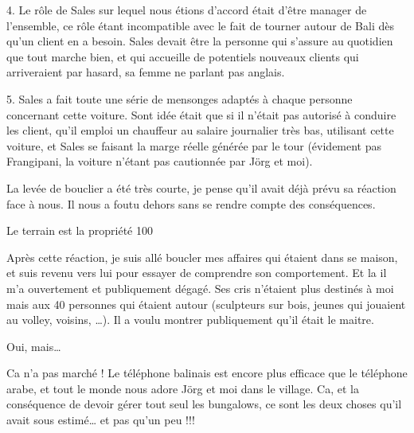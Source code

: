 \par
4. Le rôle de Sales sur lequel nous étions d’accord était d’être manager de l’ensemble, ce rôle étant incompatible avec le fait de tourner autour de Bali dès qu’un client en a besoin. Sales devait être la personne qui s’assure au quotidien que tout marche bien, et qui accueille de potentiels nouveaux clients qui arriveraient par hasard, sa femme ne parlant pas anglais.

\par
5. Sales a fait toute une série de mensonges adaptés à chaque personne concernant cette voiture. Sont idée était que si il n’était pas autorisé à conduire les client, qu’il emploi un chauffeur au salaire journalier très bas, utilisant cette voiture, et Sales se faisant la marge réelle générée par le tour (évidement pas Frangipani, la voiture n’étant pas cautionnée par Jörg et moi).

\par
La levée de bouclier a été très courte, je pense qu’il avait déjà prévu sa réaction face à nous. Il nous a foutu dehors sans se rendre compte des conséquences.

\par
Le terrain est la propriété 100%

\par
Après cette réaction, je suis allé boucler mes affaires qui étaient dans se maison, et suis revenu vers lui pour essayer de comprendre son comportement. Et la il m’a ouvertement et publiquement dégagé. Ses cris n’étaient plus destinés à moi mais aux 40 personnes qui étaient autour (sculpteurs sur bois, jeunes qui jouaient au volley, voisins, …). Il a voulu montrer publiquement qu’il était le maitre.

\par
Oui, mais…

\par
Ca n’a pas marché ! Le téléphone balinais est encore plus efficace que le téléphone arabe, et tout le monde nous adore Jörg et moi dans le village. Ca, et la conséquence de devoir gérer tout seul les bungalows, ce sont les deux choses qu’il avait sous estimé… et pas qu’un peu !!!

